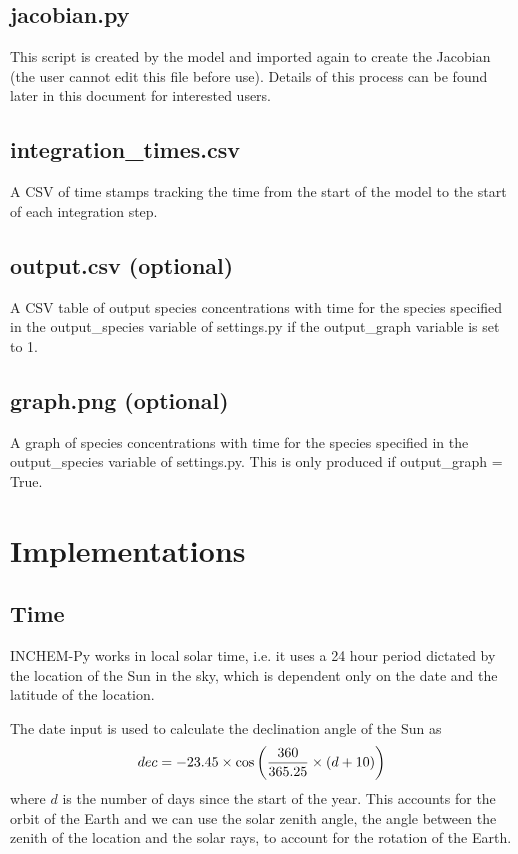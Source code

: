 \documentclass[a4paper]{refart}
\begin{document}
\subsection{jacobian.py}
This script is created by the model and imported again to create the Jacobian (the user cannot edit this file before use). Details of this process can be found later in this document for interested users. 

\subsection{integration\_times.csv}
A CSV of time stamps tracking the time from the start of the model to the start of each integration step. 

\subsection{output.csv (optional)}
A CSV table of output species concentrations with time for the species specified in the output\_species variable of settings.py if the output\_graph variable is set to 1.

\subsection{graph.png (optional)}
A graph of species concentrations with time for the species specified in the output\_species variable of settings.py. This is only produced if output\_graph = True.

\newpage
\section{Implementations}
\subsection{Time}
INCHEM-Py works in local solar time, i.e. it uses a 24 hour period dictated by the location of the Sun in the sky, which is dependent only on the date and the latitude of the location. 

The date input is used to calculate the declination angle of the Sun as
\begin{equation}\index{declination angle}
    dec = -23.45 \times \cos\left(\frac{360}{365.25}\times (d+10)\right)
\end{equation}
where $d$ is the number of days since the start of the year. This accounts for the orbit of the Earth and we can use the solar zenith angle, the angle between the zenith of the location and the solar rays, to account for the rotation of the Earth.
\end{document}

